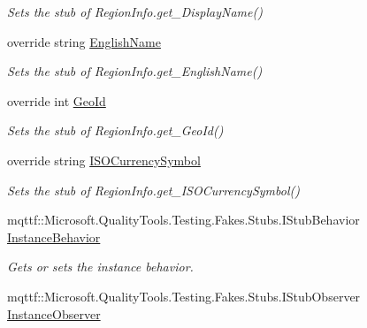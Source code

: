 \begin{DoxyCompactItemize}
\begin{DoxyCompactList}\small\item\em Sets the stub of Region\-Info.\-get\-\_\-\-Display\-Name()\end{DoxyCompactList}\item 
override string \hyperlink{class_system_1_1_globalization_1_1_fakes_1_1_stub_region_info_a5ad17251a864d807990313459a239091}{English\-Name}
\begin{DoxyCompactList}\small\item\em Sets the stub of Region\-Info.\-get\-\_\-\-English\-Name()\end{DoxyCompactList}\item 
override int \hyperlink{class_system_1_1_globalization_1_1_fakes_1_1_stub_region_info_ac2e3e0451e91bd1fab2dc4a1fb5167f6}{Geo\-Id}
\begin{DoxyCompactList}\small\item\em Sets the stub of Region\-Info.\-get\-\_\-\-Geo\-Id()\end{DoxyCompactList}\item 
override string \hyperlink{class_system_1_1_globalization_1_1_fakes_1_1_stub_region_info_a89a7070ddd00c600c4d0515ce6415317}{I\-S\-O\-Currency\-Symbol}
\begin{DoxyCompactList}\small\item\em Sets the stub of Region\-Info.\-get\-\_\-\-I\-S\-O\-Currency\-Symbol()\end{DoxyCompactList}\item 
mqttf\-::\-Microsoft.\-Quality\-Tools.\-Testing.\-Fakes.\-Stubs.\-I\-Stub\-Behavior \hyperlink{class_system_1_1_globalization_1_1_fakes_1_1_stub_region_info_abe5ab7e7c8e4f9be64d6352621a4a6d6}{Instance\-Behavior}
\begin{DoxyCompactList}\small\item\em Gets or sets the instance behavior.\end{DoxyCompactList}\item 
mqttf\-::\-Microsoft.\-Quality\-Tools.\-Testing.\-Fakes.\-Stubs.\-I\-Stub\-Observer \hyperlink{class_system_1_1_globalization_1_1_fakes_1_1_stub_region_info_a2de69838e02d212646362fe1b03663d6}{Instance\-Observer}

\end{DoxyCompactItemize}
